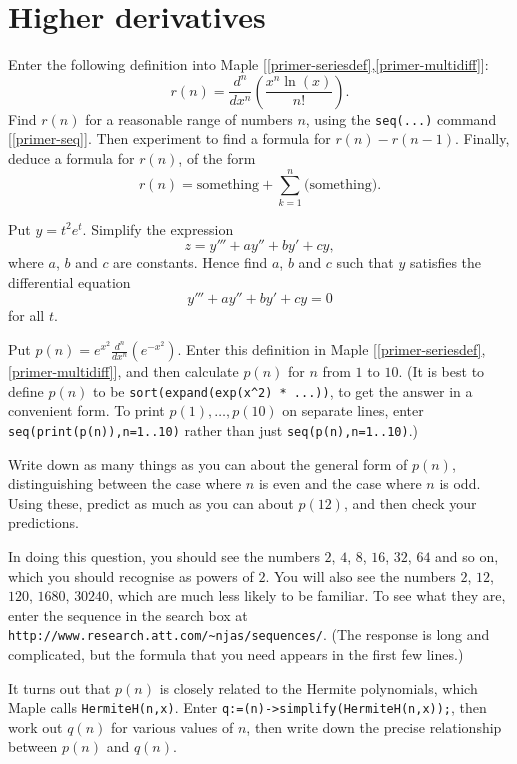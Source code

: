 \documentclass[a4paper,10pt]{amsbook}
\begin{document}
\section{Higher derivatives}

\begin{exercise}\label{ex-Psi}
 Enter the following definition into Maple
 [\ref{primer-seriesdef},\ref{primer-multidiff}]:
 \[ r(n) =
    \frac{d^n}{dx^n}\left(\frac{x^n\ln(x)}{n!}\right). 
 \]
 Find $r(n)$ for a reasonable range of numbers $n$, using
 the \verb~seq(...)~ command [\ref{primer-seq}].  Then
 experiment to find a formula for $r(n)-r(n-1)$.  Finally,
 deduce a formula for $r(n)$, of the form
 \[ r(n) = \text{something} +
            \sum_{k=1}^{n}\text{(something)}. 
 \]
\end{exercise}

\begin{exercise}\label{ex-diffop-jordan}
 Put $y=t^2e^t$.  Simplify the expression 
 \[ z = y''' + a y'' + b y' + c y, \]
 where $a$, $b$ and $c$ are constants.  Hence find $a$, $b$
 and $c$ such that $y$ satisfies the differential equation 
 \[ y''' + a y'' + by' + c y = 0 \]
 for all $t$. 
\end{exercise}

\begin{exercise}\label{ex-hermite}
 Put $p(n)=e^{x^2}\frac{d^n}{dx^n}(e^{-x^2})$.  Enter this
 definition in Maple [\ref{primer-seriesdef},\ref{primer-multidiff}], and then
 calculate $p(n)$ for $n$ from  $1$ to $10$.  (It is best to
 define $p(n)$ to be \verb~sort(expand(exp(x^2) * ...))~, to
 get the  answer in a convenient form.  To print
 $p(1),\ldots,p(10)$ on separate lines, enter
 \verb~seq(print(p(n)),n=1..10)~ rather than just
 \verb~seq(p(n),n=1..10)~.)  
 
 Write down as many things as you can about the general form
 of $p(n)$, distinguishing between the case where $n$ is
 even and the case where $n$ is odd.  Using these, predict
 as much as you can about $p(12)$, and then
 check your predictions. 
 
 In doing this question, you should see the numbers $2$,
 $4$, $8$, $16$, $32$, $64$ and so on, which you should
 recognise as powers of $2$.  You will also see the numbers
 $2$, $12$, $120$, $1680$, $30240$, which are much less
 likely to be familiar.  To see what they are, enter the
 sequence in the search box at
 \verb+http://www.research.att.com/~njas/sequences/+.  (The
 response is long and complicated, but the formula that you
 need appears in the first few lines.) 

 It turns out that $p(n)$ is closely related to the Hermite
 polynomials, which Maple calls \verb~HermiteH(n,x)~.  Enter 
 \verb~q:=(n)->simplify(HermiteH(n,x));~, then work out
 $q(n)$ for various values of $n$, then write down the
 precise relationship between $p(n)$ and $q(n)$.  
\end{exercise}
\end{document}
